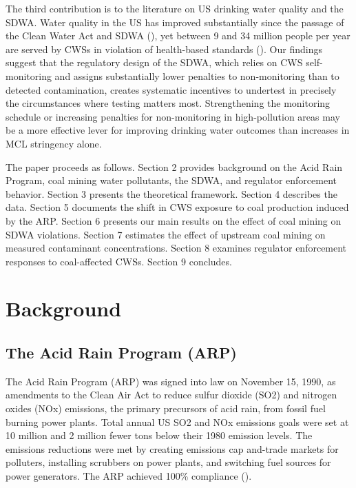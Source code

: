 \documentclass{article}
\begin{document}
The third contribution is to the literature on US drinking water quality and the SDWA. Water quality in the US has improved substantially since the passage of the Clean Water Act and SDWA (\cite{keiser2019consequences}), yet between 9 and 34 million people per year are served by CWSs in violation of health-based standards (\cite{allaire2018national}). Our findings suggest that the regulatory design of the SDWA, which relies on CWS self-monitoring and assigns substantially lower penalties to non-monitoring than to detected contamination, creates systematic incentives to undertest in precisely the circumstances where testing matters most. Strengthening the monitoring schedule or increasing penalties for non-monitoring in high-pollution areas may be a more effective lever for improving drinking water outcomes than increases in MCL stringency alone.

The paper proceeds as follows. Section 2 provides background on the Acid Rain Program, coal mining water pollutants, the SDWA, and regulator enforcement behavior. Section 3 presents the theoretical framework. Section 4 describes the data. Section 5 documents the shift in CWS exposure to coal production induced by the ARP. Section 6 presents our main results on the effect of coal mining on SDWA violations. Section 7 estimates the effect of upstream coal mining on measured contaminant concentrations. Section 8 examines regulator enforcement responses to coal-affected CWSs. Section 9 concludes.

\section{Background}

\subsection{The Acid Rain Program (ARP)}

The Acid Rain Program (ARP) was signed into law on November 15, 1990, as amendments to the Clean Air Act to reduce sulfur dioxide (SO2) and nitrogen oxides (NOx) emissions, the primary precursors of acid rain, from fossil fuel burning power plants. Total annual US SO2 and NOx emissions goals were set at 10 million and 2 million fewer tons below their 1980 emission levels. The emissions reductions were met by creating emissions cap and-trade markets for polluters, installing scrubbers on power plants, and switching fuel sources for power generators. The ARP achieved 100\% compliance (\cite{lattanzio2022clean}). 
\end{document}
